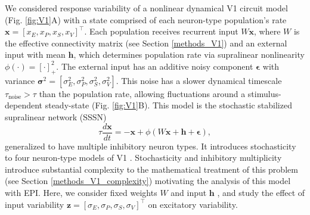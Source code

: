\documentclass[11pt]{article}
\begin{document}
We considered response variability of a nonlinear dynamical V1 circuit model (Fig. \ref{fig:V1}A) with a state comprised of each neuron-type population's rate $\mathbf{x} = \left[x_E, x_P , x_S, x_V \right]^\top$.
Each population receives recurrent input $W \mathbf{x}$, where $W$ is the effective connectivity matrix (see Section \ref{methods_V1}) and
an external input with mean $\mathbf{h}$, which determines population rate via supralinear nonlinearity $\phi(\cdot) = \left[\cdot \right]^2_+$.
The external input has an additive noisy component $\bm{\epsilon}$ with variance $\bm{\sigma}^2 = \left[ \sigma_E^2, \sigma_P^2, \sigma_S^2, \sigma_V^2\right]$.
This noise has a slower dynamical timescale $\tau_{\text{noise}} > \tau$ than the population rate, allowing fluctuations around a stimulus-dependent steady-state (Fig. \ref{fig:V1}B).
This model is the stochastic stabilized supralinear network (SSSN) \cite{hennequin2018dynamical} 
\begin{equation}
    \tau \frac{d\mathbf{x}}{dt} = -\mathbf{x} +\phi(W\mathbf{x} + \mathbf{h} + \bm{\epsilon}),
\end{equation}
generalized to have multiple inhibitory neuron types.  It introduces stochasticity to four neuron-type models of V1 \cite{litwin2016inhibitory}.
Stochasticity and inhibitory multiplicity introduce substantial complexity to the mathematical treatment of this problem (see Section \ref{methods_V1_complexity}) motivating the analysis of this model with EPI.
Here, we consider fixed weights $W$ and input $\mathbf{h}$ \cite{palmigiano2020structure}, and study the effect of input variability $\mathbf{z} = [\sigma_E, \sigma_P, \sigma_S, \sigma_V]^\top$ on excitatory variability.
\end{document}
